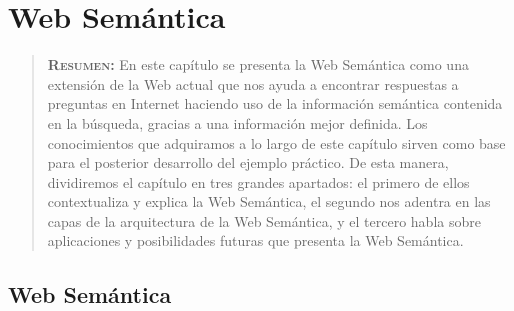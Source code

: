 


\chapter{Web Semántica}
\label{ch:web-semantinca}

\begin{quote}
  {\bf\textsc{Resumen:}} En este capítulo se presenta la Web Semántica como una extensión de la Web actual que nos ayuda a encontrar respuestas a preguntas en Internet haciendo uso de la información semántica contenida en la búsqueda, gracias a una información mejor definida. Los conocimientos que adquiramos a lo largo de este capítulo sirven como base para el posterior desarrollo del ejemplo práctico. De esta manera, dividiremos el capítulo en tres grandes apartados: el primero de ellos contextualiza y explica la Web Semántica, el segundo nos adentra en las capas de la arquitectura de la Web Semántica, y el tercero habla sobre aplicaciones y posibilidades futuras que presenta la Web Semántica.
\end{quote}

\section{Web Semántica}

